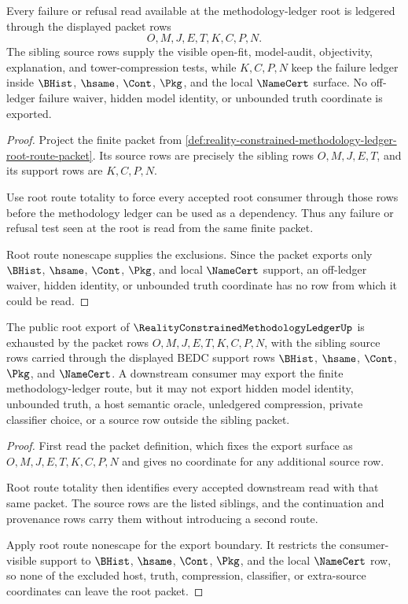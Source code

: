 \begin{theorem}
\label{thm:reality-constrained-methodology-ledger-root-failure-ledger-surface}
Every failure or refusal read available at the methodology-ledger root is ledgered through the displayed packet rows
$$
O,M,J,E,T,K,C,P,N.
$$
The sibling source rows supply the visible open-fit, model-audit, objectivity, explanation, and tower-compression tests, while $K,C,P,N$ keep the failure ledger inside $\BHist$, $\hsame$, $\Cont$, $\Pkg$, and the local $\NameCert$ surface. No off-ledger failure waiver, hidden model identity, or unbounded truth coordinate is exported.
\end{theorem}
\begin{proof}
Project the finite packet from \autoref{def:reality-constrained-methodology-ledger-root-route-packet}. Its source rows are precisely the sibling rows $O,M,J,E,T$, and its support rows are $K,C,P,N$.

Use root route totality to force every accepted root consumer through those rows before the methodology ledger can be used as a dependency. Thus any failure or refusal test seen at the root is read from the same finite packet.

Root route nonescape supplies the exclusions. Since the packet exports only $\BHist$, $\hsame$, $\Cont$, $\Pkg$, and local $\NameCert$ support, an off-ledger waiver, hidden identity, or unbounded truth coordinate has no row from which it could be read.
\end{proof}

\begin{theorem}
\label{thm:reality-constrained-methodology-ledger-root-export-nonescape}
The public root export of $\RealityConstrainedMethodologyLedgerUp$ is exhausted by the packet rows $O,M,J,E,T,K,C,P,N$, with the sibling source rows carried through the displayed BEDC support rows $\BHist$, $\hsame$, $\Cont$, $\Pkg$, and $\NameCert$. A downstream consumer may export the finite methodology-ledger route, but it may not export hidden model identity, unbounded truth, a host semantic oracle, unledgered compression, private classifier choice, or a source row outside the sibling packet.
\end{theorem}
\begin{proof}
First read the packet definition, which fixes the export surface as $O,M,J,E,T,K,C,P,N$ and gives no coordinate for any additional source row.

Root route totality then identifies every accepted downstream read with that same packet. The source rows are the listed siblings, and the continuation and provenance rows carry them without introducing a second route.

Apply root route nonescape for the export boundary. It restricts the consumer-visible support to $\BHist$, $\hsame$, $\Cont$, $\Pkg$, and the local $\NameCert$ row, so none of the excluded host, truth, compression, classifier, or extra-source coordinates can leave the root packet.
\end{proof}
